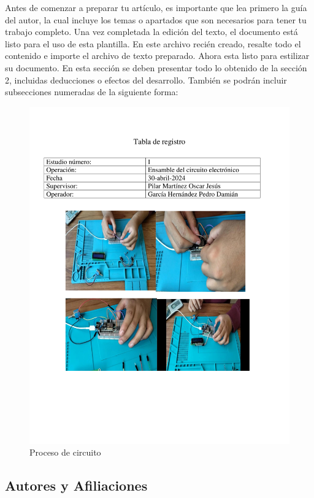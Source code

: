     Antes de comenzar a preparar tu artículo, es importante que lea primero la guía del autor, la cual incluye los temas o apartados que son necesarios para tener tu trabajo completo.
    Una vez completada la edición del texto, el documento está listo para el uso de esta plantilla. En este archivo recién creado, resalte todo el contenido e importe el archivo de texto preparado. Ahora esta listo para estilizar su documento.
    En esta sección se deben presentar todo lo obtenido de la sección 2, incluidas deducciones o efectos del desarrollo. También se podrán incluir subsecciones numeradas de la siguiente forma:
    \begin{figure}[H]
        \centering
        \includegraphics[trim = {10mm 10mm 10mm 10mm},clip,scale=0.45]{24/Img/procesodeCircuito.pdf}
        \caption{Proceso de circuito}
        \label{fig: Proceso de circuito}
    \end{figure}
    
    \subsection{Autores y Afiliaciones}
    

